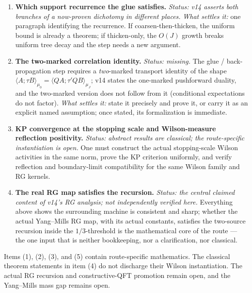 \documentclass[11pt]{article}
\theoremstyle{definition}
\newcommand{\dmax}{d_{\max}}
\begin{document}
\begin{enumerate}
    The resulting actual constant can then be checked against
    $C\,b^{\,3-\dmax}\leq1/3$.
  \item \textbf{Which support recurrence the glue satisfies.}
    \emph{Status: v14 asserts both branches of a now-proven dichotomy in
    different places.} \emph{What settles it:} one paragraph identifying the
    recurrence. If coarsen-then-thicken, the uniform bound is already a
    theorem; if thicken-only, the $O(J)$ growth breaks uniform tree decay and
    the step needs a new argument.
  \item \textbf{The two-marked correlation identity.}
    \emph{Status: missing.} The glue / back-propagation step requires a
    \emph{two}-marked transport identity of the shape
    $\langle A;\tau B\rangle_{\mu_0} = \langle QA;\tau' QB\rangle_{\mu_J}$;
    v14 states the one-marked pushforward duality, and the two-marked version
    does not follow from it (conditional expectations do not factor).
    \emph{What settles it:} state it precisely and prove it, or carry it as an
    explicit named assumption; once stated, its formalization is immediate.
  \item \textbf{KP convergence at the stopping scale and Wilson-measure
    reflection positivity.} \emph{Status: abstract results are classical; the
    route-specific instantiation is open.} One must construct the actual
    stopping-scale Wilson activities in the same norm, prove the KP criterion
    uniformly, and verify reflection and boundary-limit compatibility for the
    same Wilson family and RG kernels.
  \item \textbf{The real RG map satisfies the recursion.}
    \emph{Status: the central claimed content of v14's RG analysis; not
    independently verified here.} Everything above shows the surrounding
    machine is consistent and sharp; whether the actual Yang--Mills RG map, with
    its actual constants, satisfies the two-source recursion inside the
    $1/3$-threshold is the mathematical core of the route --- the one input
    that is neither bookkeeping, nor a clarification, nor classical.
\end{enumerate}

Items (1), (2), (3), and (5) contain route-specific mathematics. The classical
theorem statements in item (4) do not discharge their Wilson instantiation.
The actual RG recursion and constructive-QFT promotion remain open, and the
Yang--Mills mass gap remains open.
\end{document}
